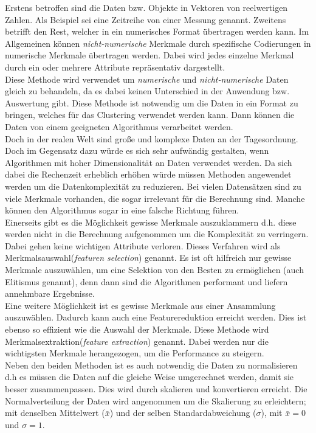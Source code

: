 Erstens betroffen sind die Daten bzw. Objekte in Vektoren von reelwertigen Zahlen. Als Beispiel sei eine Zeitreihe von einer Messung genannt.  Zweitens betrifft den Rest, welcher in ein numerisches Format übertragen werden kann. Im Allgemeinen können \textit{nicht-numerische} Merkmale durch spezifische Codierungen in numerische Merkmale übertragen werden. Dabei wird jedes einzelne Merkmal durch ein oder mehrere Attribute repräsentativ dargestellt.\cite{pell91}\\ 
Diese Methode wird verwendet um \textit{numerische} und \textit{nicht-numerische} Daten gleich zu behandeln, da es dabei keinen Unterschied in der Anwendung bzw. Auswertung gibt. Diese Methode ist notwendig um die Daten in ein Format zu bringen, welches für das Clustering verwendet werden kann. Dann können die Daten von einem geeigneten Algorithmus verarbeitet werden.\cite{pell91}\\ 
Doch in der realen Welt sind große und komplexe Daten an der Tagesordnung. Doch im Gegensatz dazu würde es sich sehr aufwändig gestalten, wenn  Algorithmen mit hoher Dimensionalität an Daten verwendet werden. Da sich dabei die Rechenzeit erheblich erhöhen würde müssen Methoden angewendet werden um die Datenkomplexität zu reduzieren. Bei vielen Datensätzen sind  zu viele Merkmale vorhanden, die sogar irrelevant für die Berechnung sind. Manche können den Algorithmus sogar in eine falsche Richtung führen.\cite{pell91}\\
Einerseits gibt es die Möglichkeit gewisse Merkmale auszuklammern d.h. diese werden nicht in die Berechnung aufgenommen um die Komplexität zu verringern. Dabei gehen keine wichtigen Attribute verloren. Dieses Verfahren wird als Merkmalsauswahl(\textit{featuren selection}) genannt. Es ist oft hilfreich nur gewisse Merkmale auszuwählen, um eine Selektion von den Besten zu ermöglichen (auch Elitismus genannt), denn dann sind die Algorithmen performant und liefern annehmbare Ergebnisse.\cite{pell91}\\ 
Eine weitere Möglichkeit ist es gewisse Merkmale aus einer Ansammlung auszuwählen. Dadurch kann auch eine Featurereduktion erreicht werden. Dies ist ebenso so effizient wie die Auswahl der Merkmale.  Diese Methode wird Merkmalsextraktion(\textit{feature extraction}) genannt. Dabei werden nur die wichtigsten Merkmale herangezogen, um die Performance zu steigern.\cite{pell91}\\
Neben den beiden Methoden ist es auch notwendig die Daten zu normalisieren d.h es müssen die Daten auf die gleiche Weise umgerechnet werden, damit sie besser zusammenpassen. Dies wird durch skalieren und konvertieren erreicht.  Die Normalverteilung der Daten wird angenommen um die Skalierung zu erleichtern; mit denselben Mittelwert (\(\bar{x}\)) und der selben Standardabweichung (\(\sigma\)), mit \(\bar{x} = 0\) und \(\sigma = 1\).\cite{pell91}\\

